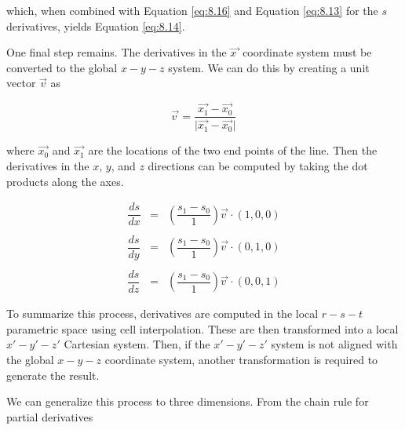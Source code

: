 which, when combined with Equation \ref{eq:8.16} and Equation \ref{eq:8.13} for the $s$ derivatives, yields Equation \ref{eq:8.14}.

One final step remains. The derivatives in the $\overrightarrow{x\ }$ coordinate system must be converted to the global $x-y-z$ system. We can do this by creating a unit vector $\overrightarrow{v}$ as

\begin{equation}\label{eq:8.18}
\overrightarrow{v\ } = \frac{\overrightarrow{x_1} - \overrightarrow{x_0 }}{\vert\overrightarrow{x_1} - \overrightarrow{x_0} \vert}
\end{equation}

where $\overrightarrow{x_0}$ and $\overrightarrow{x_1}$ are the locations of the two end points of the line. Then the derivatives in the $x$, $y$, and $z$ directions can be computed by taking the dot products along the axes.

\begin{equation}\label{eq:8.19}
\begin{array}{lll}
\dfrac{ds}{dx}  &=& \left(\dfrac{s_1 - s_0}{1}\right) \overrightarrow{v\ } \cdot (1, 0, 0) \\ \\
\dfrac{ds}{dy}  &=& \left(\dfrac{s_1 - s_0}{1}\right) \overrightarrow{v\ } \cdot (0, 1, 0) \\ \\
\dfrac{ds}{dz}  &=& \left(\dfrac{s_1 - s_0}{1}\right) \overrightarrow{v\ } \cdot (0, 0, 1)
\end{array}
\end{equation}

To summarize this process, derivatives are computed in the local $r-s-t$ parametric space using cell interpolation. These are then transformed into a local $x'-y'-z'$ Cartesian system. Then, if the $x'-y'-z'$ system is not aligned with the global $x-y-z$ coordinate system, another transformation is required to generate the result.

We can generalize this process to three dimensions. From the chain rule for partial derivatives

